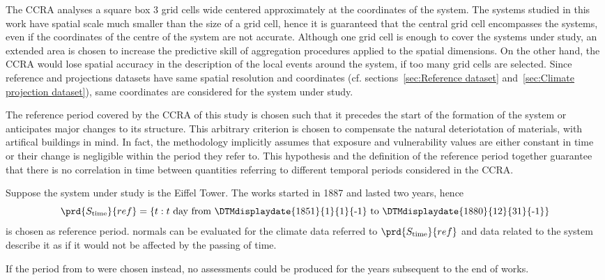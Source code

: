 The \gls{CCRA} analyses a square box 3 grid cells wide centered approximately at the coordinates of the system. The systems studied in this work have spatial scale much smaller than the size of a grid cell, hence it is guaranteed that the central grid cell encompasses the systems, even if the coordinates of the centre of the system are not accurate.
Although one grid cell is enough to cover the systems under study, an extended area is chosen to increase the predictive skill of aggregation procedures applied to the spatial dimensions. On the other hand, the \gls{CCRA} would lose spatial accuracy in the description of the local events around the system, if too many grid cells are selected.
Since reference and projections datasets have same spatial resolution and coordinates (cf. sections~\ref{sec:Reference dataset} and~\ref{sec:Climate projection dataset}), same coordinates are considered for the system under study.

The reference period covered by the \gls{CCRA} of this study is chosen such that it precedes the start of the formation of the system or anticipates major changes to its structure. This arbitrary criterion is chosen to compensate the natural deteriotation of materials, with artifical buildings in mind. In fact, the methodology implicitly assumes that exposure and vulnerability values are either constant in time or their change is negligible within the period they refer to. This hypothesis and the definition of the reference period together guarantee that there is no correlation in time between quantities referring to different temporal periods considered in the \gls{CCRA}.
\begin{example}
  Suppose the system under study is the Eiffel Tower. The works started in 1887 and lasted two years, hence
  \begin{equation*}
    \prd{S_\text{time}}{ref} = \{ t : \text{$t$ day from \DTMdisplaydate{1851}{1}{1}{-1} to \DTMdisplaydate{1880}{12}{31}{-1}} \}
  \end{equation*}
  is chosen as reference period. \Glspl{normal} can be evaluated for the climate data referred to $\prd{S_\text{time}}{ref}$ and data related to the system describe it as if it would not be affected by the passing of time.
  
  If the period from  to  were chosen instead, no assessments could be produced for the years subsequent to the end of works.
\end{example}

